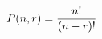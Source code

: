 \documentclass[preview]{standalone}
\begin{document}
\begin{align*}
\special{dvisvgm:raw <g id='unique000'>}P(n, r) = \frac{n!}{(n-r)!}\special{dvisvgm:raw </g>}
\end{align*}
\end{document}

